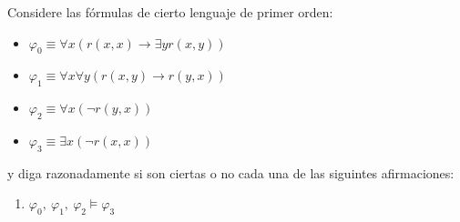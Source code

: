 \documentclass[12pt]{article}
\begin{document}
    \begin{ejercicio}
        Considere las fórmulas de cierto lenguaje de primer orden:
        \begin{itemize}
            \item $\varphi_0 \equiv \forall x (r(x, x) \rightarrow \exists y r(x, y))$
            \item $\varphi_1 \equiv \forall x \forall y (r(x, y) \rightarrow r(y, x))$
            \item $\varphi_2 \equiv \forall x (\lnot r(y, x))$
            \item $\varphi_3 \equiv \exists x (\lnot r(x, x))$
        \end{itemize}
        y diga razonadamente si son ciertas o no cada una de las siguintes afirmaciones:
        \begin{enumerate}
            \item $\varphi_0,~\varphi_1,~\varphi_2 \models \varphi_3$
            

\end{enumerate}
\end{ejercicio}
\end{document}

